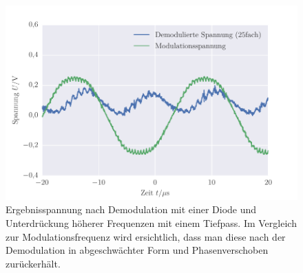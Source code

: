 
\FloatBarrier\begin{figure}[!h]
\centering
\includegraphics[scale=1]{../Grafiken/Amplituden_Modulation_Diode_Demodulation_Tiefpass.pdf}
\caption{Ergebnisspannung nach Demodulation mit einer Diode und Unterdrückung höherer Frequenzen mit 
	einem Tiefpass. Im Vergleich zur Modulationsfrequenz wird ersichtlich, dass man diese nach der
	Demodulation in abgeschwächter Form und Phasenverschoben zurückerhält.
	  \label{fig:amplituden_modulation_diode_demodulation_tiefpass}}
\end{figure}
\FloatBarrier